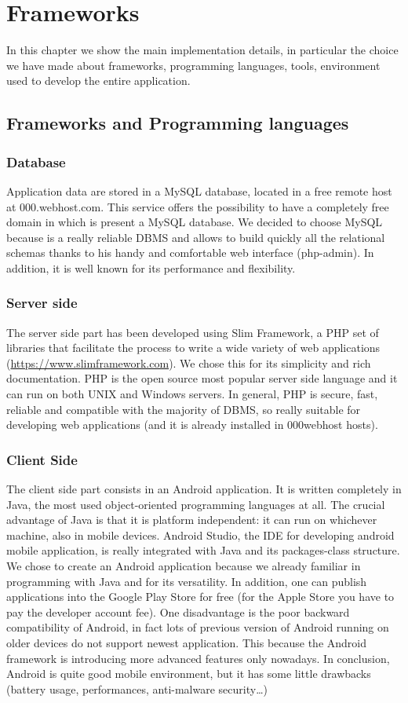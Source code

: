 \chapter{Frameworks}
In this chapter we show the main implementation details, in particular the choice we have made about frameworks, programming languages, tools, environment used to develop the entire application.
 

\section{Frameworks and Programming languages}
\subsection{Database}
Application data are stored in a MySQL database, located in a free remote host at 000.webhost.com. This service offers the possibility to have a completely free domain in which is present a MySQL database. We decided to choose MySQL because is a really reliable DBMS and allows to build quickly all the relational schemas thanks to his handy and comfortable web interface (php-admin). In addition, it is well known for its performance and flexibility.

\subsection{Server side}
The server side part has been developed using Slim Framework, a PHP set of libraries that facilitate the process to write a wide variety of web applications (\url{https://www.slimframework.com}). We chose this for its simplicity and rich documentation. PHP is the open source most popular server side language and it can run on both UNIX and Windows servers. In general, PHP is secure, fast, reliable and compatible with the majority of DBMS, so really suitable for developing web applications (and it is already installed in 000webhost hosts).

\subsection{Client Side}
The client side part consists in an Android application. It is written completely in Java, the most used object-oriented programming languages at all. The crucial advantage of Java is that it is platform independent: it can run on whichever machine, also in mobile devices. Android Studio, the IDE for developing android mobile application, is really integrated with Java and its packages-class structure. We chose to create an Android application because we already familiar in programming with Java and for its versatility. In addition, one can publish applications into the Google Play Store for free (for the Apple Store you have to pay the developer account fee). One disadvantage is the poor backward compatibility of Android, in fact lots of previous version of Android running on older devices do not support newest application. This because the Android framework is introducing more advanced features only nowadays. In conclusion, Android is quite good mobile environment, but it has some little drawbacks (battery usage, performances, anti-malware security…)


